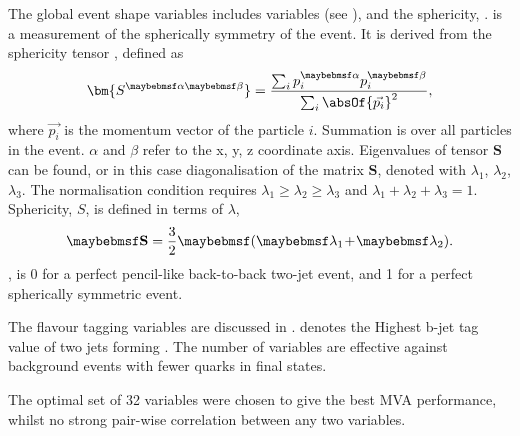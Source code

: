 The global event shape variables includes \y{} variables (see ), and the sphericity,  \sphericity. \sphericity is a measurement of the spherically symmetry of the event. It is  derived from the sphericity tensor \cite{PhysRevLett.35.1609}, defined as
\begin{equation}
\bm{S^{\alpha\beta}} = \frac{\sum_{i}p^{\alpha}_{i}p^{\beta}_{i}}{\sum_{i}\absOf{\vec{p_{i}}}^2},
\end{equation}
where $\vec{p_{i}}$ is the momentum vector of the particle $i$. Summation is over all particles in the event. $\alpha$ and $\beta$ refer to the x, y, z coordinate axis. Eigenvalues of tensor $\bm{S}$ can be found, or in this case diagonalisation of the matrix $\bm{S}$, denoted with $\lambda_{1}$, $\lambda_{2}$, $\lambda_{3}$. The normalisation condition requires $\lambda_{1}\!\geqslant\! \lambda_{2} \! \geqslant \! \lambda_{3}$ and $ \lambda_{1} \! + \! \lambda_{2} \! + \! \lambda_{3} \! = \! 1 $. Sphericity, $S$, is defined in terms of $\lambda$,
\begin{equation}
\sphericity = \frac{3}{2}\parenths{\lambda_{1} \! + \! \lambda_{2}}.
\end{equation}
\sphericity, is 0 for a perfect pencil-like back-to-back two-jet event, and 1 for a perfect spherically symmetric event.

The flavour tagging variables are discussed in .  denotes the Highest b-jet tag value of two jets forming \Hbb. The number of \PFOs variables are effective against background events with fewer quarks in final states.

The optimal set of 32 variables  were chosen to give the best MVA performance, whilst no strong pair-wise correlation between any two variables. %


